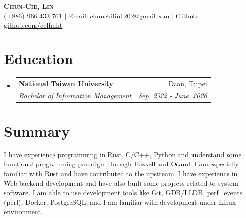 \documentclass[letterpaper,11pt]{article}
\makeatletter
\newcommand{\resumeItem}[1]{
  \item\small{
    {#1 \vspace{-2pt}}
  }
}
\newcommand{\resumeSubheading}[4]{
  \vspace{-2pt}\item
    \begin{tabular*}{0.97\textwidth}[t]{l@{\extracolsep{\fill}}r}
      \textbf{#1} & #2 \\
      \textit{\small#3} & \textit{\small #4} \\
    \end{tabular*}\vspace{-7pt}
}
\newcommand{\resumeSubHeadingListStart}{\begin{itemize}[leftmargin=0.15in, label={}]}
\newcommand{\resumeSubHeadingListEnd}{\end{itemize}}
\newcommand{\resumeItemListStart}{\begin{itemize}}
\newcommand{\resumeItemListEnd}{\end{itemize}\vspace{-5pt}}
\makeatother
\begin{document}

\begin{center}
	\textbf{\Huge \scshape Chun-Chi, Lin} \\ \vspace{1pt}
	\small (+886) 966-433-761 $|$ Email: \href{mailto:chunchilin0202@gmail.com}{\underline{chunchilin0202@gmail.com}} $|$
	Github: \href{https://github.com/cclfmht}{\underline{github.com/cclfmht}}
\end{center}


\section{Education}
\resumeSubHeadingListStart
\resumeSubheading
{National Taiwan University}{Daan, Taipei}
{Bachelor of Information Management}{Sep. 2022 - June. 2026}
\resumeSubHeadingListEnd

\section{Summary}
I have experience programming in Rust, C/C++, Python and understand some functional programming
paradigm through Haskell and Ocaml. I am especially familiar with Rust and have contributed to
the upstream. I have experience in Web backend development and have also built some projects
related to system software. I am able to use development tools like Git, GDB/LLDB,
perf\_events (perf), Docker, PostgreSQL, and I am familiar with development under Linux environment.


\end{document}
